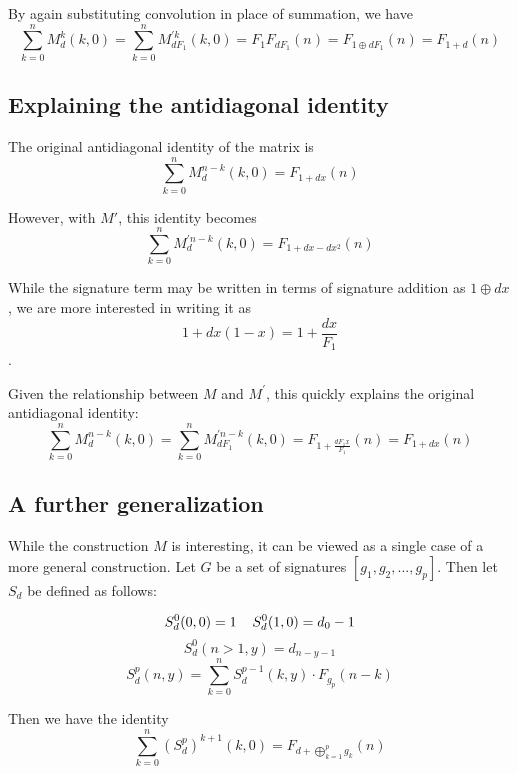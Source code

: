 \documentclass{article}
\begin{document}
\noindent By again substituting convolution in place of summation, we have \begin{equation}\sum_{k=0}^{n} M_d^k (k, 0) = \sum_{k=0}^{n} M_{dF_1}^{\prime k} (k, 0) = F_1 F_{dF_1} (n) = F_{1 \oplus dF_1}(n) = F_{1 + d}(n)\end{equation}

\subsection{Explaining the antidiagonal identity}

\noindent The original antidiagonal identity of the matrix is \begin{equation}\sum_{k=0}^{n} M_d^{n-k} (k, 0) = F_{1+dx} (n)\end{equation}

\noindent However, with $M'$, this identity becomes \begin{equation}\sum_{k=0}^{n} M_{d}^{\prime n-k} (k, 0) = F_{1+dx - dx^{2}}(n)\end{equation}

\noindent While the signature term may be written in terms of signature addition as $ 1 \oplus dx$, we are more interested in writing it as \begin{equation}1 + dx(1-x)= 1 + \frac{dx}{F_1}\end{equation}.

\noindent Given the relationship between $M$ and $M^{\prime}$, this quickly explains the original antidiagonal identity: \begin{equation}\sum_{k=0}^{n} M_d^{n-k}(k,0) = \sum_{k=0}^{n} M_{dF_1}^{\prime n-k} (k, 0) = F_{1 + \frac{dF_1x}{F_1}}(n) = F_{1 + dx}(n)\end{equation}

\subsection{A further generalization}

While the construction $M$ is interesting, it can be viewed as a single case of a more general construction. Let $G$ be a set of signatures $[g_1, g_2, ..., g_p]$. Then let $S_d$ be defined as follows:

$$ S_d^0(0,0) = 1 \hspace{4mm} S_d^0(1,0) = d_0 - 1 $$
$$ S_d^0(n>1, y) = d_{n-y-1}$$
$$ S_d^p(n,y) = \sum_{k=0}^{n} S_d^{p-1}(k,y) \cdot F_{g_p}(n-k)$$


\noindent Then we have the identity \begin{equation}\sum_{k=0}^{n}(S_d^p)^{k+1} (k,0) =  F_{d + \displaystyle \bigoplus_{k=1}^{p} g_k}(n)\end{equation}
\end{document}
